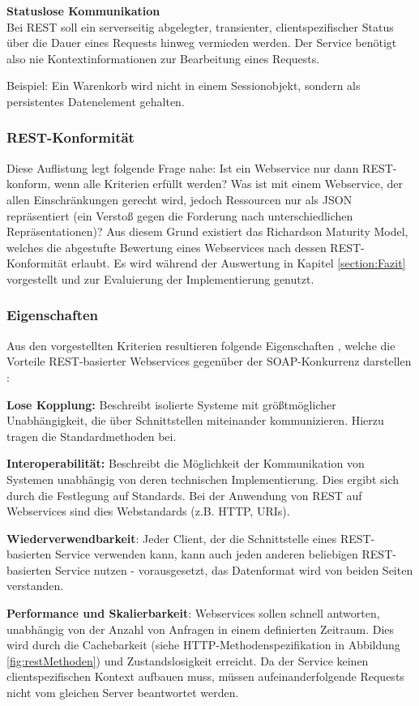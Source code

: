 \documentclass[11pt, a4paper, titlepage, listof=totoc, bibliography=totoc, index=totoc, twoside, openright, headings=normal]{scrreprt}
\begin{document}
\textbf{Statuslose Kommunikation}\\
Bei REST soll ein serverseitig abgelegter, transienter, clientspezifischer Status über die Dauer eines Requests hinweg vermieden werden. Der Service benötigt also nie Kontextinformationen zur Bearbeitung eines Requests.

Beispiel: Ein Warenkorb wird nicht in einem Sessionobjekt, sondern als persistentes Datenelement gehalten.

\subsubsection{REST-Konformität}
\label{REST-Konformität}
Diese Auflistung legt folgende Frage nahe: Ist ein Webservice nur dann REST-konform, wenn alle Kriterien erfüllt werden? Was ist mit einem Webservice, der allen Einschränkungen gerecht wird, jedoch Ressourcen nur als JSON repräsentiert (ein Verstoß gegen die Forderung nach unterschiedlichen Repräsentationen)? Aus diesem Grund existiert das \glqq Richardson Maturity Model\grqq{}, welches die abgestufte Bewertung eines Webservices nach dessen REST-Konformität erlaubt. Es wird während der Auswertung in Kapitel \ref{section:Fazit} vorgestellt und zur Evaluierung der Implementierung genutzt.

\subsubsection{Eigenschaften}
\label{REST-Eigenschaften}
Aus den vorgestellten Kriterien resultieren folgende Eigenschaften \citep{tilkov11},  welche die Vorteile REST-basierter Webservices gegenüber der SOAP-Konkurrenz darstellen \citep{richardson07}:

\begin{compactitem}
\item [\textbf{Lose Kopplung:}] Beschreibt isolierte Systeme mit größtmöglicher Unabhängigkeit, die über Schnittstellen miteinander kommunizieren. Hierzu tragen die Standardmethoden bei.
\item [\textbf{Interoperabilität:}] Beschreibt die Möglichkeit der Kommunikation von Systemen unabhängig von deren technischen Implementierung. Dies ergibt sich durch die Festlegung auf Standards. Bei der Anwendung von REST auf Webservices sind dies Webstandards (z.B. HTTP, URIs).
\item [\textbf{Wiederverwendbarkeit}:] Jeder Client, der die Schnittstelle eines REST-basierten Service verwenden kann, kann auch jeden anderen beliebigen REST-basierten Service nutzen - vorausgesetzt, das Datenformat wird von beiden Seiten verstanden.
\item [\textbf{Performance und Skalierbarkeit}:] Webservices sollen schnell antworten, unabhängig von der Anzahl von Anfragen in einem definierten Zeitraum. Dies wird durch die Cachebarkeit (siehe HTTP-Methodenspezifikation in Abbildung \ref{fig:restMethoden}) und Zustandslosigkeit erreicht. Da der Service keinen clientspezifischen Kontext aufbauen muss, müssen aufeinanderfolgende Requests nicht vom gleichen Server beantwortet werden.
\end{compactitem}
\pagebreak
\end{document}
